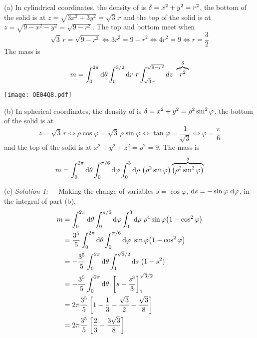 \begin{solution}
(a) 
In cylindrical coordinates, the density of is $\delta=x^2+y^2=r^2$,
the bottom of the solid is at $z=\sqrt{3x^2+3y^2}=\sqrt{3}\,r$ and the
top of the solid is at $z=\sqrt{9-x^2-y^2}=\sqrt{9-r^2}$. 
The top and bottom meet when 
\begin{equation*}
\sqrt{3}\,r=\sqrt{9-r^2}\iff 3r^2=9-r^2\iff 4r^2=9\iff r=\frac{3}{2}
\end{equation*}
The mass is
\begin{align*}
m=\int_0^{2\pi}\dee{\theta}\int_0^{3/2}\dee{r}\ r\int_{\sqrt{3}\,r}^{\sqrt{9-r^2}}dz\ \overbrace{r^2}^{\de}
\end{align*}

\begin{center}
     \texttt{[image: OE04Q8.pdf]}
\end{center}


(b) In spherical coordinates, the density of is 
$\delta=x^2+y^2=\rho^2\sin^2\varphi$,
the bottom of the solid is at 
\begin{equation*}
z=\sqrt{3}\,r\iff \rho\cos\varphi=\sqrt{3}\,\rho\sin\varphi\iff
\tan\varphi=\frac{1}{\sqrt{3}}\iff\varphi=\frac{\pi}{6}
\end{equation*} 
and the top of the solid is at $x^2+y^2+z^2=\rho^2=9$. 
The mass is
\begin{equation*}
m=\int_0^{2\pi}\dee{\theta}\int_0^{\pi/6}\dee{\varphi}\int_0^3\dee{\rho}\ \big(\rho^2\sin\varphi\big)
\overbrace{\big(\rho^2\sin^2\varphi\big)}^{\de}
\end{equation*}



(c) \emph{Solution 1:}\ \ \  Making the change of variables $s=\cos\varphi$, 
$\mathrm{d}s=-\sin\varphi\ \mathrm{d}\varphi$, in the integral of part (b),
\begin{align*}
m&=\int_0^{2\pi}\dee{\theta}\int_0^{\pi/6}\dee{\varphi}
  \int_0^3\dee{\rho}\ \rho^4\sin\varphi \big(1-\cos^2\varphi\big) \\
&=\frac{3^5}{5}\int_0^{2\pi}\dee{\theta}\int_0^{\pi/6}\dee{\varphi}\ \sin\varphi
\big(1-\cos^2\varphi\big) \\
&=-\frac{3^5}{5}\int_0^{2\pi}\dee{\theta}\int_1^{\sqrt{3}/2}\dee{s}\  (1-s^2) \\
&=-\frac{3^5}{5}\int_0^{2\pi}\dee{\theta}\ \left[s-\frac{s^3}{3}\right]_1^{\sqrt{3}/2} \\
&=2\pi \frac{3^5}{5} \left[1-\frac{1}{3}-\frac{\sqrt{3}}{2}+\frac{\sqrt{3}}{8}\right] \\
&=2\pi \frac{3^5}{5} \left[\frac{2}{3}-\frac{3\sqrt{3}}{8}\right]
\end{align*}


\end{solution}
